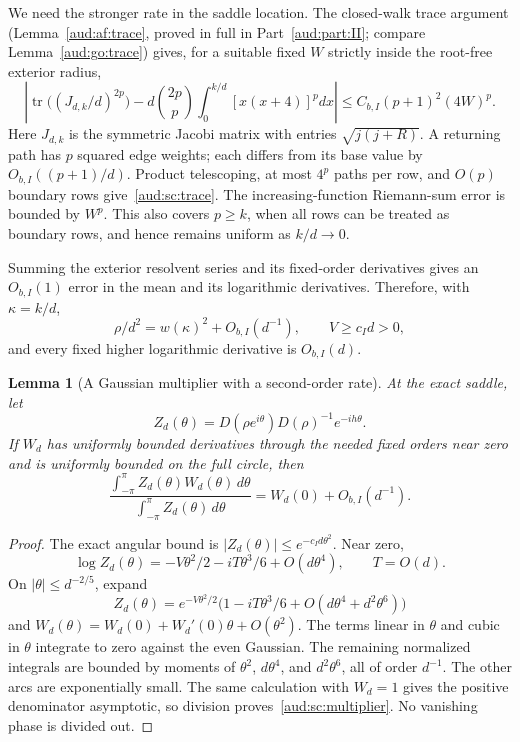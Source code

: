 \documentclass[11pt,a4paper]{article}
\numberwithin{equation}{section}
\newtheorem{lemma}[theorem]{Lemma}
\begin{document}
We need the stronger rate in the saddle location. The closed-walk trace argument (Lemma~\ref{aud:af:trace}, proved in full in Part~\ref{aud:part:II}; compare Lemma~\ref{aud:go:trace}) gives, for a suitable fixed $W$ strictly inside the root-free exterior radius,
\begin{equation}\label{aud:sc:trace}
 \left|\operatorname{tr}\bigl((J_{d,k}/d)^{2p}\bigr)
 -d\binom{2p}{p}\int_0^{k/d}[x(x+4)]^pdx\right|
 \le C_{b,I}(p+1)^2(4W)^p.
\end{equation}
Here $J_{d,k}$ is the symmetric Jacobi matrix with entries $\sqrt{j(j+R)}$. A returning path has $p$ squared edge weights; each differs from its base value by $O_{b,I}((p+1)/d)$. Product telescoping, at most $4^p$ paths per row, and $O(p)$ boundary rows give~\eqref{aud:sc:trace}. The increasing-function Riemann-sum error is bounded by $W^p$. This also covers $p\ge k$, when all rows can be treated as boundary rows, and hence remains uniform as $k/d\to0$.

Summing the exterior resolvent series and its fixed-order derivatives gives an $O_{b,I}(1)$ error in the mean and its logarithmic derivatives. Therefore, with $\kappa=k/d$,
\begin{equation}\label{aud:sc:saddlerate}
 \rho/d^2=w(\kappa)^2+O_{b,I}(d^{-1}),\qquad
 V\ge c_I d>0,
\end{equation}
and every fixed higher logarithmic derivative is $O_{b,I}(d)$.

\begin{lemma}[A Gaussian multiplier with a second-order rate]\label{aud:sc:Gaussianrate}
At the exact saddle, let
\[
 Z_d(\theta)=D(\rho e^{i\theta})D(\rho)^{-1}e^{-ih\theta}.
\]
If $W_d$ has uniformly bounded derivatives through the needed fixed orders near zero and is uniformly bounded on the full circle, then
\begin{equation}\label{aud:sc:multiplier}
 \frac{\int_{-\pi}^{\pi}Z_d(\theta)W_d(\theta)\,d\theta}
 {\int_{-\pi}^{\pi}Z_d(\theta)\,d\theta}
 =W_d(0)+O_{b,I}(d^{-1}).
\end{equation}
\end{lemma}
\begin{proof}
The exact angular bound is $|Z_d(\theta)|\le e^{-c_I d\theta^2}$. Near zero,
\[
 \log Z_d(\theta)=-V\theta^2/2-iT\theta^3/6+O(d\theta^4),
 \qquad T=O(d).
\]
On $|\theta|\le d^{-2/5}$, expand
\[
 Z_d(\theta)=e^{-V\theta^2/2}
 \bigl(1-iT\theta^3/6+O(d\theta^4+d^2\theta^6)\bigr)
\]
and $W_d(\theta)=W_d(0)+W_d'(0)\theta+O(\theta^2)$. The terms linear in $\theta$ and cubic in $\theta$ integrate to zero against the even Gaussian. The remaining normalized integrals are bounded by moments of $\theta^2$, $d\theta^4$, and $d^2\theta^6$, all of order $d^{-1}$. The other arcs are exponentially small. The same calculation with $W_d=1$ gives the positive denominator asymptotic, so division proves~\eqref{aud:sc:multiplier}. No vanishing phase is divided out.
\end{proof}
\end{document}
